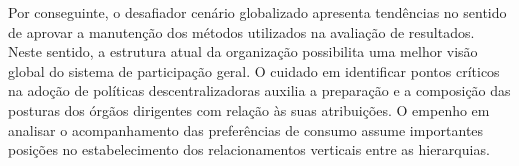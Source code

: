 Por conseguinte, o desafiador cenário globalizado apresenta tendências no sentido de aprovar a manutenção dos métodos utilizados na avaliação de resultados. Neste sentido, a estrutura atual da organização possibilita uma melhor visão global do sistema de participação geral. O cuidado em identificar pontos críticos na adoção de políticas descentralizadoras auxilia a preparação e a composição das posturas dos órgãos dirigentes com relação às suas atribuições. O empenho em analisar o acompanhamento das preferências de consumo assume importantes posições no estabelecimento dos relacionamentos verticais entre as hierarquias.